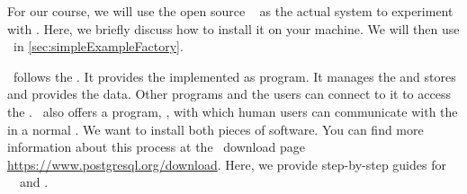 %
%
\label{sec:installingPostgres}%
%
For our course, we will use the open source  \postgresql~\cite{TA2024DDAMWPAM,FP2023LP,OH2017PUAR,B2024PELUYDW} as the actual system to experiment with .
Here, we briefly discuss how to install it on your machine.
We will then use \postgresql\ in \cref{sec:simpleExampleFactory}.

\postgresql\ follows the .
It provides the  implemented as  program.
It manages the  and stores and provides the data.
Other programs and the users can connect to it to access the .
\postgresql\ also offers a  program, \psql, with which human users can communicate with the   in a normal .
We want to install both pieces of software.
You can find more information about this process at the \postgresql\ download page \url{https://www.postgresql.org/download}.
Here, we provide step-by-step guides for \ubuntu\ \linux\ and \microsoftWindows.%
%
%
%
%
\endhsection%
%
